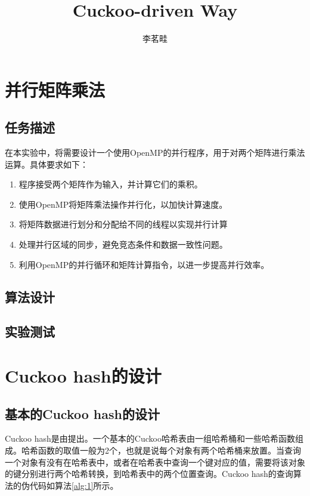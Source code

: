 \documentclass[supercite]{Experimental_Report}
\title{Cuckoo-driven Way}
\author{李茗畦}
\theoremstyle{definition}
\begin{document}
\maketitle

\tableofcontents

\section{并行矩阵乘法}
\subsection{任务描述}
在本实验中，将需要设计一个使用OpenMP的并行程序，用于对两个矩阵进行乘法运算。具体要求如下：
\begin{enumerate}
\item 程序接受两个矩阵作为输入，并计算它们的乘积。
\item 使用OpenMP将矩阵乘法操作并行化，以加快计算速度。
\item 将矩阵数据进行划分和分配给不同的线程以实现并行计算
\item 处理并行区域的同步，避免竞态条件和数据一致性问题。
\item 利用OpenMP的并行循环和矩阵计算指令，以进一步提高并行效率。
\end{enumerate}

\subsection{算法设计}

\subsection{实验测试}

\newpage
\section{Cuckoo hash的设计}

\subsection{基本的Cuckoo hash的设计}
Cuckoo hash是由提出。一个基本的Cuckoo哈希表由一组哈希桶和一些哈希函数组成。哈希函数的取值一般为2个，也就是说每个对象有两个哈希桶来放置。当查询一个对象有没有在哈希表中，或者在哈希表中查询一个键对应的值，需要将该对象的键分别进行两个哈希转换，到哈希表中的两个位置查询。Cuckoo hash的查询算法的伪代码如算法\ref{alg:1}所示。
\end{document}
